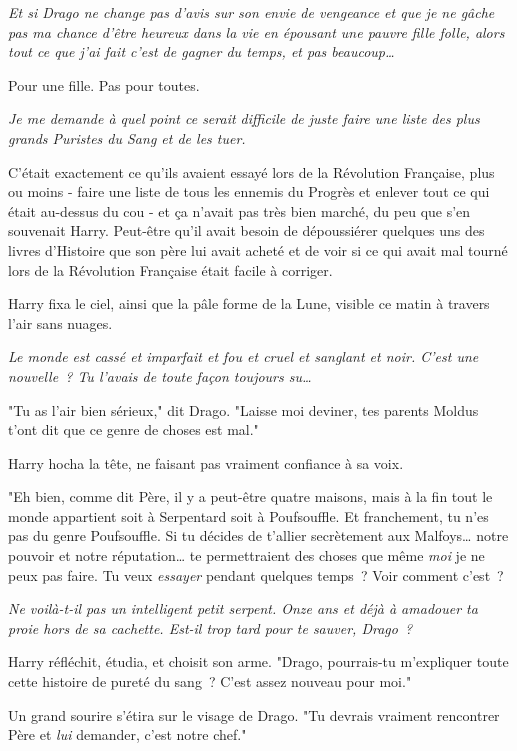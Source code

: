 \emph{Et si Drago ne change pas d'avis sur son envie de vengeance et que je ne gâche pas ma chance d'être heureux dans la vie en épousant une pauvre fille folle, alors tout ce que j'ai fait c'est de gagner du temps, et pas beaucoup…}

Pour une fille. Pas pour toutes.

\emph{Je me demande à quel point ce serait difficile de juste faire une liste des plus grands Puristes du Sang et de les tuer.}

C'était exactement ce qu'ils avaient essayé lors de la Révolution Française, plus ou moins - faire une liste de tous les ennemis du Progrès et enlever tout ce qui était au-dessus du cou - et ça n'avait pas très bien marché, du peu que s'en souvenait Harry. Peut-être qu'il avait besoin de dépoussiérer quelques uns des livres d'Histoire que son père lui avait acheté et de voir si ce qui avait mal tourné lors de la Révolution Française était facile à corriger.

Harry fixa le ciel, ainsi que la pâle forme de la Lune, visible ce matin à travers l'air sans nuages.

\emph{Le monde est cassé et imparfait et fou et cruel et sanglant et noir. C'est une nouvelle~? Tu l'avais de toute façon toujours su…}

"Tu as l'air bien sérieux," dit Drago. "Laisse moi deviner, tes parents Moldus t'ont dit que ce genre de choses est mal."

Harry hocha la tête, ne faisant pas vraiment confiance à sa voix.

"Eh bien, comme dit Père, il y a peut-être quatre maisons, mais à la fin tout le monde appartient soit à Serpentard soit à Poufsouffle. Et franchement, tu n'es pas du genre Poufsouffle. Si tu décides de t'allier secrètement aux Malfoys… notre pouvoir et notre réputation… te permettraient des choses que même \emph{moi} je ne peux pas faire. Tu veux \emph{essayer} pendant quelques temps~? Voir comment c'est~?

\emph{Ne voilà-t-il pas un intelligent petit serpent. Onze ans et déjà à amadouer ta proie hors de sa cachette. Est-il trop tard pour te sauver, Drago~?}

Harry réfléchit, étudia, et choisit son arme. "Drago, pourrais-tu m'expliquer toute cette histoire de pureté du sang~? C'est assez nouveau pour moi."

Un grand sourire s'étira sur le visage de Drago. "Tu devrais vraiment rencontrer Père et \emph{lui} demander, c'est notre chef."


